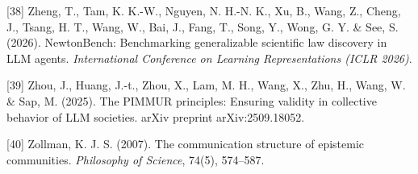 \documentclass[pdflatex,sn-basic]{sn-jnl}
\begin{document}
{[}38{]} Zheng, T., Tam, K. K.-W., Nguyen, N. H.-N. K., Xu, B., Wang, Z., Cheng, J., Tsang, H. T., Wang, W., Bai, J., Fang, T., Song, Y., Wong, G. Y. \& See, S. (2026). NewtonBench: Benchmarking generalizable scientific law discovery in LLM agents. \emph{International Conference on Learning Representations (ICLR 2026)}.

{[}39{]} Zhou, J., Huang, J.-t., Zhou, X., Lam, M. H., Wang, X., Zhu, H., Wang, W. \& Sap, M. (2025). The PIMMUR principles: Ensuring validity in collective behavior of LLM societies. arXiv preprint arXiv:2509.18052.

{[}40{]} Zollman, K. J. S. (2007). The communication structure of epistemic communities. \emph{Philosophy of Science}, 74(5), 574--587.
\endgroup
\end{document}
